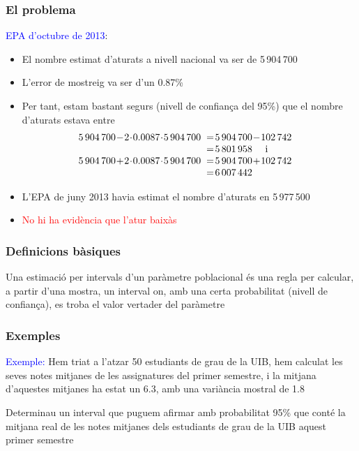 \documentclass[12pt,t]{beamer}
\newcommand{\red}[1]{\textcolor{red}{#1}}
\newcommand{\blue}[1]{\textcolor{blue}{#1}}
\renewcommand{\emph}[1]{{\color{red}#1}}
\theoremstyle{plain}
\theoremstyle{definition}
\begin{document}
\begin{frame}
\frametitle{El problema}
\vspace*{-2ex}

\blue{EPA d'octubre de 2013}: \smallskip
\begin{itemize}
\item El nombre estimat d'aturats a nivell nacional va ser de 5\,904\,700 \smallskip

\item L'error de mostreig va ser d'un 0.87\% \smallskip

\item Per tant, estam bastant segurs (nivell de confiança del 95\%) que el nombre d'aturats estava entre
$$
\begin{array}{rl}
\hspace*{-2ex} 5\,904\,700\!-\! 2\!\cdot \! 0.0087\!\cdot\! 5\,904\,700 & \hspace*{-1ex}=\! 5\,904\,700\!-\! 102\,742\\ &  \hspace*{-1ex}=\! 5\,801\,958\quad \mbox{ i}\\
\hspace*{-2ex} 5\,904\,700\!+\!2\!\cdot\! 0.0087\!\cdot\! 5\,904\,700 & \hspace*{-1ex}=\! 5\,904\,700\!+\! 102\,742\\ & \hspace*{-1ex}=\! 6\,007\,442
 \end{array}
 $$
 
 \item L'EPA de juny 2013 havia estimat el nombre d'aturats en 5\,977\,500
 \smallskip
 
 \item \red{No hi ha evidència que l'atur baixàs}
 \end{itemize}
\end{frame}







\begin{frame}
\frametitle{Definicions bàsiques}

Una \emph{estimació per intervals} d'un paràmetre poblacional és una regla per calcular, a partir d'una mostra, un interval on, amb una certa probabilitat (\emph{nivell de confiança}), es troba el  valor vertader del paràmetre
\bigskip


\end{frame}


\begin{frame}
\frametitle{Exemples}


\blue{Exemple:} 
Hem triat a l'atzar 50 estudiants de grau de la UIB, hem calculat les seves notes mitjanes de les assignatures del primer semestre, i la mitjana d'aquestes mitjanes ha estat un 6.3, amb una variància mostral  de 1.8\medskip

Determinau un interval que puguem afirmar amb probabilitat 95\% que conté la mitjana real de les notes mitjanes dels estudiants de grau de la UIB aquest primer semestre
\end{frame}
\end{document}
